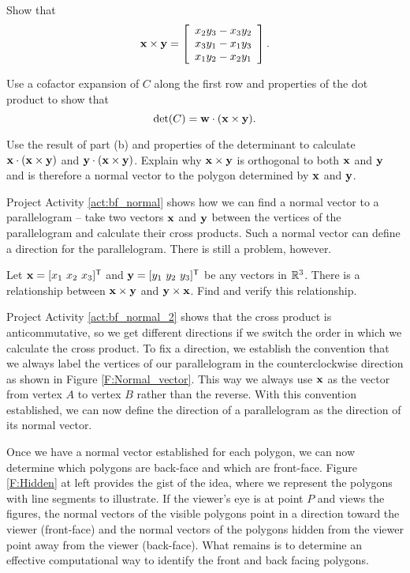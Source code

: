 \begin{pactivity}
\ba
\item Show that 
\[\mathbf{x} \times \mathbf{y} = \left[ \begin{array}{c} x_2y_3-x_3y_2 \\ x_3y_1-x_1y_3 \\ x_1y_2-x_2y_1 \end{array} \right].\]


\item  Use a cofactor expansion of $C$ along the first row and properties of the dot product to show that 
\[\det(C) = \mathbf{w} \cdot (\mathbf{x} \times \mathbf{y}).\]


\item Use the result of part (b) and properties of the determinant to calculate $\mathbf{x} \cdot (\mathbf{x} \times \mathbf{y})$ and $\mathbf{y} \cdot (\mathbf{x} \times \mathbf{y})$. Explain why $\mathbf{x} \times \mathbf{y}$ is orthogonal to both $\mathbf{x}$ and $\mathbf{y}$ and is therefore a normal vector to the polygon determined by $\mathbf{x}$ and $\mathbf{y}$. 


	\ea
	
\end{pactivity}

Project Activity \ref{act:bf_normal} shows how we can find a normal vector to a parallelogram -- take two vectors $\mathbf{x}$ and $\mathbf{y}$ between the vertices of the parallelogram and calculate their cross products. Such a normal vector can define a direction for the parallelogram. There is still a problem, however.

\begin{pactivity} \label{act:bf_normal_2} Let $\mathbf{x} = [x_1 \ x_2 \ x_3]^{\mathsf{T}}$ and $\mathbf{y} = [y_1 \ y_2 \ y_3]^{\mathsf{T}}$ be any vectors in $\mathbb{R}^3$. There is a relationship between $\mathbf{x} \times \mathbf{y}$ and $\mathbf{y} \times \mathbf{x}$. Find and verify this relationship.


\end{pactivity}

Project Activity \ref{act:bf_normal_2} shows that the cross product is anticommutative, so we get different directions if we switch the order in which we calculate the cross product. To fix a direction, we establish the convention that we always label the vertices of our parallelogram in the counterclockwise direction as shown in Figure \ref{F:Normal_vector}. This way we always use $\mathbf{x}$ as the vector from vertex $A$ to vertex $B$ rather than the reverse. With this convention established, we can now define the direction of a parallelogram as the direction of its normal vector.

Once we have a normal vector established for each polygon, we can now determine which polygons are back-face and which are front-face. Figure \ref{F:Hidden} at left provides the gist of the idea, where we represent the polygons with line segments to illustrate. If the viewer's eye is at point $P$ and views the figures, the normal vectors of the visible polygons point in  a direction toward the viewer (front-face) and the normal vectors of the polygons hidden from the viewer point away from the viewer (back-face). What remains is to determine an effective computational way to identify the front and back facing polygons. 

